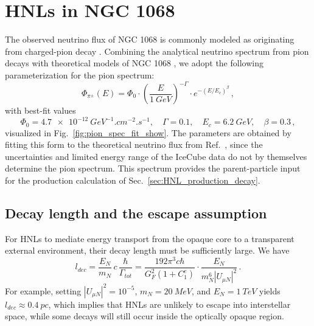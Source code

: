 \documentclass{ws-ijmpa}
\begin{document}
\section{HNLs in NGC 1068}\label{sec:HNLs_in_NGC_1068}
The observed neutrino flux of NGC 1068 is commonly modeled as originating
from charged-pion decay \cite{murase2020hidden}. Combining the analytical
neutrino spectrum from pion decays \cite{kelner2006energy} with theoretical
models of NGC 1068 \cite{murase2020hidden}, we adopt the following
parameterization for the pion spectrum:
\begin{equation}
  \Phi_{\pi^\pm}(E) = \Phi_0 \cdot \left( \frac{E}{\qty{1}{GeV}}\right)^{-\Gamma} \cdot e^{-(E / E_c)^\beta}\,, \label{eq:pion_spec_form}
\end{equation}
with best-fit values
\begin{equation}
  \Phi_0 = \qty{4.7e-12}{GeV^{-1}.cm^{-2}.s^{-1}},\quad \Gamma = 0.1,\quad E_c = \qty{6.2}{GeV},\quad \beta=0.3\,, \label{eq:pion_spec_par}
\end{equation}
visualized in Fig.~\ref{fig:pion_spec_fit_show}. The parameters are
obtained by fitting this form to the theoretical neutrino flux from Ref.~, since the uncertainties and limited energy
range of the IceCube data do not by themselves determine the pion spectrum.
This spectrum provides the parent-particle input for the production
calculation of Sec.~\ref{sec:HNL_production_decay}.

\subsection{Decay length and the escape assumption}\label{sec:decay_length}

For HNLs to mediate energy transport from the opaque core to a transparent
external environment, their decay length must be sufficiently large. We have
\begin{equation}
  l_{dec} = \frac{E_N}{m_N} \, c \, \frac{\hbar}{\Gamma_{tot}} = \frac{192 \pi^3 c \hbar}{G_F^2(1 + C_1^e)} \cdot \frac{E_N}{m_N^6 |U_{\mu N}|^2}\,.
\end{equation}
For example, setting $|U_{\mu N}|^2=10^{-5}$, $m_N=\qty{20}{MeV}$, and
$E_N=\qty{1}{TeV}$ yields $l_{dec}\approx\qty{0.4}{pc}$, which implies that
HNLs are unlikely to escape into interstellar space, while some decays will
still occur inside the optically opaque region.
\end{document}
